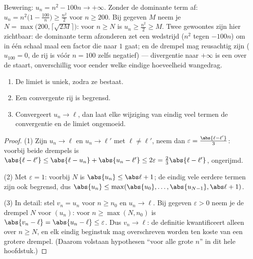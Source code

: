 \begin{example}\label{ex:b1:seq:toinfinity}
Bewering: $u_n = n^2 - 100n \to +\infty$. Zonder de dominante term af:
$u_n = n^2\bigl(1 - \frac{100}{n}\bigr) \geq \frac{n^2}{2}$ voor $n \geq
200$. Bij gegeven $M$ neem je $N = \max\bigl(200,
\lceil\sqrt{2M}\rceil\bigr)$: voor $n \geq N$ is $u_n \geq \frac{n^2}{2}
\geq M$. Twee gewoontes zijn hier zichtbaar: de dominante term afzonderen
zet een wedstrijd ($n^2$ tegen $-100n$) om in één schaal maal een factor
die naar $1$ gaat; en de drempel mag reusachtig zijn ($u_{100} = 0$, de
rij is vóór $n = 100$ zelfs negatief) --- divergentie naar $+\infty$ is
een  over de staart, onverschillig voor eender welke eindige
hoeveelheid wangedrag.
\end{example}

\begin{proposition}\label{prop:b1:seq:first}
\begin{enumerate}
  \item De limiet is uniek, zodra ze bestaat.
  \item Een convergente rij is begrensd.
  \item Convergeert $u_n \to \ell$, dan laat elke wijziging van eindig
        veel termen de convergentie en de limiet ongemoeid.
\end{enumerate}
\end{proposition}

\begin{proof}
(1) Zijn $u_n \to \ell$ en $u_n \to \ell'$ met $\ell \neq \ell'$, neem
dan $\varepsilon = \frac{\abs{\ell - \ell'}}{3}$: voorbij beide drempels
is $\abs{\ell - \ell'} \leq \abs{\ell - u_n} + \abs{u_n - \ell'} \leq
2\varepsilon = \frac23 \abs{\ell - \ell'}$, ongerijmd.

(2) Met $\varepsilon = 1$: voorbij $N$ is $\abs{u_n} \leq \abs\ell + 1$;
de eindig vele eerdere termen zijn ook begrensd, dus $\abs{u_n} \leq
\max(\abs{u_0}, \dots, \abs{u_{N-1}}, \abs\ell + 1)$.

(3) In detail: stel $v_n = u_n$ voor $n \geq n_0$ en $u_n \to \ell$. Bij
gegeven $\varepsilon > 0$ neem je de drempel $N$ voor $(u_n)$: voor $n
\geq \max(N, n_0)$ is $\abs{v_n - \ell} = \abs{u_n - \ell} \leq
\varepsilon$. Dus $v_n \to \ell$: de definitie kwantificeert alleen over
$n \geq N$, en elk eindig beginstuk mag overschreven worden ten koste van
een grotere drempel. (Daarom volstaan hypothesen ``voor alle grote $n$''
in dit hele hoofdstuk.)
\end{proof}

